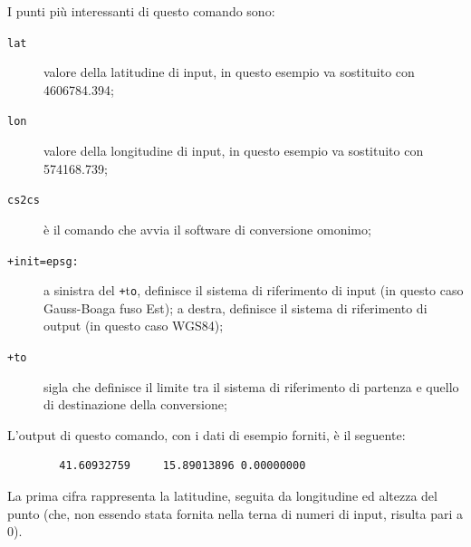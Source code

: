 	I punti più interessanti di questo comando sono:
	
	\begin{description}
		\item [{\texttt{lat}}] valore della latitudine di input, in questo esempio va sostituito con 4606784.394;
		\item [{\texttt{lon}}] valore della longitudine di input, in questo esempio va sostituito con 574168.739;
		\item [{\texttt{cs2cs}}] è il comando che avvia il software di conversione omonimo;
		\item [{\texttt{+init=epsg:}}] a sinistra del \texttt{+}t\texttt{o}, definisce il sistema di riferimento di input (in questo caso Gauss-Boaga fuso Est); a destra, definisce il sistema di riferimento di output (in questo caso WGS84);
		\item [{\texttt{+to}}] sigla che definisce il limite tra il sistema di riferimento di partenza e quello di destinazione della conversione;
	\end{description}
	
	L'output di questo comando, con i dati di esempio forniti, è il seguente:
	
	\begin{Verbatim}
		41.60932759     15.89013896 0.00000000
	\end{Verbatim}
	
	La prima cifra rappresenta la latitudine, seguita da longitudine ed altezza del punto (che, non essendo stata fornita nella terna di numeri di input, risulta pari a 0).
